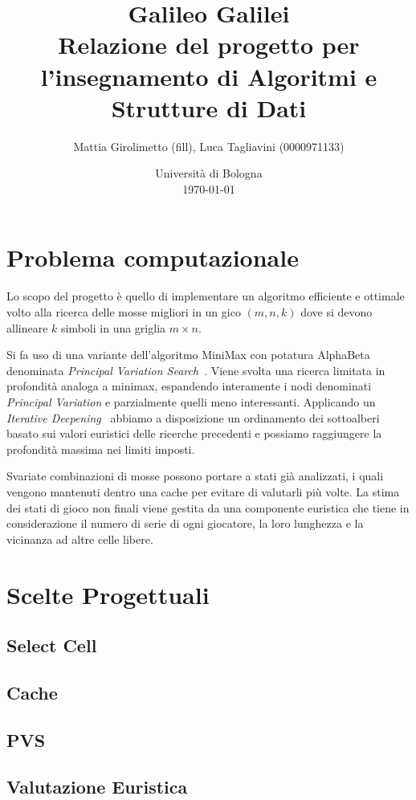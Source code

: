 \documentclass{article}
\title{Galileo Galilei \\
\large Relazione del progetto per l'insegnamento di Algoritmi e Strutture di Dati}
\author{
  Mattia Girolimetto (fill),
  Luca Tagliavini (0000971133)
}
\date{
	Universit\`a di Bologna \\
  \today
}
\begin{document}
\maketitle

\section{Problema computazionale}

Lo scopo del progetto \`e quello di implementare un algoritmo efficiente e ottimale
volto alla ricerca delle mosse migliori in un gico $(m,n,k)$ dove si devono
allineare $k$ simboli in una griglia $m \times n$.

Si fa uso di una variante dell'algoritmo MiniMax con potatura
AlphaBeta denominata \emph{Principal Variation Search}~\cite{negascout}. Viene
svolta una ricerca limitata in profondit\`a analoga a minimax, espandendo
interamente i nodi denominati \emph{Principal Variation} e parzialmente quelli
meno interessanti. Applicando un \emph{Iterative Deepening}~\cite{id} abbiamo
a disposizione un ordinamento dei sottoalberi basato sui valori euristici delle
ricerche precedenti e possiamo raggiungere la profondit\`a massima nei limiti
imposti.


Svariate combinazioni di mosse possono portare a stati gi\`a analizzati, i quali
vengono mantenuti dentro una cache per evitare di valutarli pi\`u volte.
La stima dei stati di gioco non finali viene gestita da una componente euristica che
tiene in considerazione il numero di serie di ogni giocatore, la loro lunghezza
e la vicinanza ad altre celle libere.

\section{Scelte Progettuali}

\subsection{Select Cell}
\subsection{Cache}
\subsection{PVS}
\subsection{Valutazione Euristica}

\pagebreak


\end{document}
